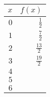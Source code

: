 \begin{tabular}{rr} \toprule
$x$  & $f(x)$         \\\midrule
$0$  & $\frac{1}{2}$  \\[6pt]
$1$  & $\frac{7}{2}$  \\[6pt]
$2$  & $\frac{13}{2}$ \\[6pt]
$3$  & $\frac{19}{2}$ \\[6pt]
$4$  &                \\[6pt]
$5$  &                \\[6pt]
$6$  &                \\\bottomrule
\end{tabular}
